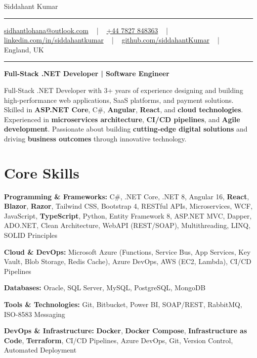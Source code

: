 \documentclass[letterpaper,10pt]{article}
\newcommand{\documentTitle}[2]{
  \begin{center}
    \vspace*{-0.3in}
    {\Huge\color{accentTitle} #1}
    \vspace{8pt}
    {\color{accentLine} \hrule}
    \vspace{2pt}
    \footnotesize{#2}
    \vspace{2pt}
    {\color{accentLine} \hrule}
  \end{center}
}
\newenvironment{resume_list}{
  \vspace{-7pt}
  \begin{itemize}[itemsep=-2px, parsep=1pt, leftmargin=30pt]
}{
  \end{itemize}
}
\begin{document}
\documentTitle{Siddahant Kumar}{
\vspace{0.1cm}
\href{mailto:sidhantlohana@outlook.com}{sidhantlohana@outlook.com} ~ | ~
\href{tel:+447827848363}{+44 7827 848363} ~ | ~
\href{https://www.linkedin.com/in/siddahantkumar/}{linkedin.com/in/siddahantkumar} ~ | ~
\href{https://github.com/siddahantKumar}{github.com/siddahantKumar} ~ | ~
England, UK
}

\begin{center}
\textbf{Full-Stack .NET Developer | Software Engineer}
\end{center}

Full-Stack .NET Developer with 3+ years of experience designing and building high-performance web applications, SaaS platforms, and payment solutions. Skilled in \textbf{ASP.NET Core}, C\#, \textbf{Angular}, \textbf{React}, and \textbf{cloud technologies}. Experienced in \textbf{microservices architecture}, \textbf{CI/CD pipelines}, and \textbf{Agile development}. Passionate about building \textbf{cutting-edge digital solutions} and driving \textbf{business outcomes} through innovative technology.


\section{Core Skills}

\begin{resume_list}
    \item \textbf{Programming \& Frameworks:} C\#, .NET Core, .NET 8, Angular 16, \textbf{React}, \textbf{Blazor}, \textbf{Razor}, Tailwind CSS, Bootstrap 4, RESTful APIs, Microservices, WCF, JavaScript, \textbf{TypeScript}, Python, Entity Framework 8, ASP.NET MVC, Dapper, ADO.NET, Clean Architecture, WebAPI (REST/SOAP), Multithreading, LINQ, SOLID Principles
    \item \textbf{Cloud \& DevOps:} Microsoft Azure (Functions, Service Bus, App Services, Key Vault, Blob Storage, Redis Cache), Azure DevOps, AWS (EC2, Lambda), CI/CD Pipelines
    \item \textbf{Databases:} Oracle, SQL Server, MySQL, PostgreSQL, MongoDB
    \item \textbf{Tools \& Technologies:} Git, Bitbucket, Power BI, SOAP/REST, RabbitMQ, ISO-8583 Messaging
    \item \textbf{DevOps \& Infrastructure:} \textbf{Docker}, \textbf{Docker Compose}, \textbf{Infrastructure as Code}, \textbf{Terraform}, CI/CD Pipelines, Azure DevOps, Git, Version Control, Automated Deployment
\end{resume_list}
\end{document}
